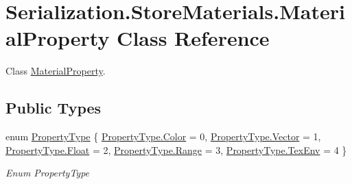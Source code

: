 \hypertarget{class_serialization_1_1_store_materials_1_1_material_property}{}\section{Serialization.\+Store\+Materials.\+Material\+Property Class Reference}
\label{class_serialization_1_1_store_materials_1_1_material_property}


Class \hyperlink{class_serialization_1_1_store_materials_1_1_material_property}{Material\+Property}.  


\subsection*{Public Types}
\begin{DoxyCompactItemize}
\item 
enum \hyperlink{class_serialization_1_1_store_materials_1_1_material_property_ada94aa82642f597d5dc5b6d48b27da12}{Property\+Type} \{ \newline
\hyperlink{class_serialization_1_1_store_materials_1_1_material_property_ada94aa82642f597d5dc5b6d48b27da12acb5feb1b7314637725a2e73bdc9f7295}{Property\+Type.\+Color} = 0, 
\hyperlink{class_serialization_1_1_store_materials_1_1_material_property_ada94aa82642f597d5dc5b6d48b27da12a57dea6f5039281b7fee517fc43bf3110}{Property\+Type.\+Vector} = 1, 
\hyperlink{class_serialization_1_1_store_materials_1_1_material_property_ada94aa82642f597d5dc5b6d48b27da12a22ae0e2b89e5e3d477f988cc36d3272b}{Property\+Type.\+Float} = 2, 
\hyperlink{class_serialization_1_1_store_materials_1_1_material_property_ada94aa82642f597d5dc5b6d48b27da12a87ba2ecc8b6915e8bd6f5089918229fd}{Property\+Type.\+Range} = 3, 
\newline
\hyperlink{class_serialization_1_1_store_materials_1_1_material_property_ada94aa82642f597d5dc5b6d48b27da12a2daac4a9dfd4ec152e8014dec4c0717c}{Property\+Type.\+Tex\+Env} = 4
 \}\begin{DoxyCompactList}\small\item\em Enum Property\+Type \end{DoxyCompactList}
\end{DoxyCompactItemize}
